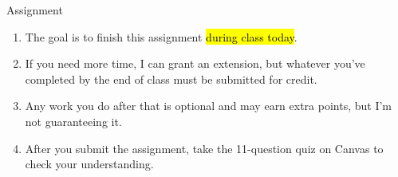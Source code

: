 \documentclass[aspectratio=43,11pt]{beamer}
\begin{document}
\begin{frame}{Assignment}
\begin{enumerate}
\item The goal is to finish this assignment \hl{during class today}.
\item If you need more time, I can grant an extension, but whatever you've completed by the end of class must be submitted for credit.
\item Any work you do after that is optional and may earn extra points, but I'm not guaranteeing it.
\item After you submit the assignment, take the 11-question quiz on Canvas to check your understanding.
\end{enumerate}
\end{frame}
\end{document}
